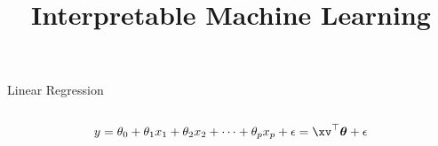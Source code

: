 \documentclass[11pt,compress,t,notes=noshow, aspectratio=169, xcolor=table]{beamer}
\title{Interpretable Machine Learning}
\date{}
\begin{document}
\newcommand{\titlefigure}{figure/whitebox}
\newcommand{\learninggoals}{
\item Interpretation of main effects in LM
\item Inclusion of high-order and interaction effects
\item Regularization via LASSO
}





\begin{frame}[c]{Linear Regression}

\begin{columns}[T, totalwidth = \linewidth]
\begin{column}{0.58\linewidth}
$$y = \theta_0 + \theta_1 x_1 + \theta_2 x_2 + \dots + \theta_p x_p + \epsilon = \xv^\top \boldsymbol{\theta} + \epsilon$$


\end{column}
\end{columns}
\end{frame}
\end{document}

